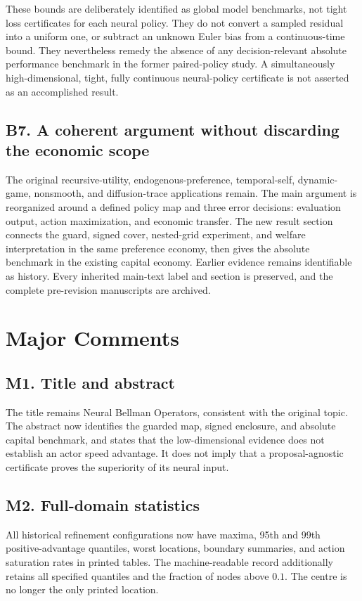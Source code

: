 These bounds are deliberately identified as global model benchmarks, not tight loss certificates for each neural policy. They do not convert a sampled residual into a uniform one, or subtract an unknown Euler bias from a continuous-time bound. They nevertheless remedy the absence of any decision-relevant absolute performance benchmark in the former paired-policy study. A simultaneously high-dimensional, tight, fully continuous neural-policy certificate is not asserted as an accomplished result.

\subsection*{B7. A coherent argument without discarding the economic scope}
The original recursive-utility, endogenous-preference, temporal-self, dynamic-game, nonsmooth, and diffusion-trace applications remain. The main argument is reorganized around a defined policy map and three error decisions: evaluation output, action maximization, and economic transfer. The new result section connects the guard, signed cover, nested-grid experiment, and welfare interpretation in the same preference economy, then gives the absolute benchmark in the existing capital economy. Earlier evidence remains identifiable as history. Every inherited main-text label and section is preserved, and the complete pre-revision manuscripts are archived.

\section{Major Comments}
\subsection*{M1. Title and abstract}
The title remains Neural Bellman Operators, consistent with the original topic. The abstract now identifies the guarded map, signed enclosure, and absolute capital benchmark, and states that the low-dimensional evidence does not establish an actor speed advantage. It does not imply that a proposal-agnostic certificate proves the superiority of its neural input.

\subsection*{M2. Full-domain statistics}
All historical refinement configurations now have maxima, 95th and 99th positive-advantage quantiles, worst locations, boundary summaries, and action saturation rates in printed tables. The machine-readable record additionally retains all specified quantiles and the fraction of nodes above $0.1$. The centre is no longer the only printed location.

